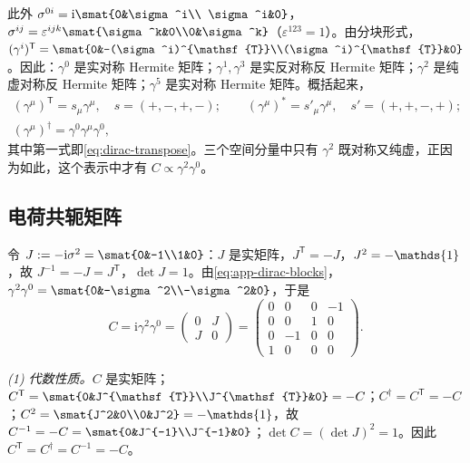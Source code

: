 \documentclass[UTF8,a4paper,11pt,fontset=fandol]{ctexart}
\let\amsmathbb\mathbb
\renewcommand{\mathbb}[1]{\ifx1#1\mathds{1}\else\amsmathbb{#1}\fi}
\theoremstyle{cplain}
\theoremstyle{cdefinition}
\theoremstyle{cremark}
\numberwithin{equation}{section}
\newcommand{\tp}{\mathsf{T}}                         %
\newcommand{\ii}{\mathrm{i}}                        %
\begin{document}
此外 $\sigma^{0i}=\ii\smat{0&\sigma^i\\ \sigma^i&0}$，$\sigma^{ij}=\varepsilon^{ijk}\smat{\sigma^k&0\\0&\sigma^k}$（$\varepsilon^{123}=1$）。由分块形式，$(\gamma^i)^{\tp}=\smat{0&-(\sigma^i)^{\tp}\\(\sigma^i)^{\tp}&0}$。因此：$\gamma^0$ 是实对称 Hermite 矩阵；$\gamma^1,\gamma^3$ 是实反对称反 Hermite 矩阵；$\gamma^2$ 是纯虚对称反 Hermite 矩阵；$\gamma^5$ 是实对称 Hermite 矩阵。概括起来，
\begin{equation}\label{eq:app-dirac-patterns}
\begin{gathered}
(\gamma^\mu)^{\tp}=s_\mu\gamma^\mu,\quad s=(+,-,+,-);\qquad
(\gamma^\mu)^*=s'_\mu\gamma^\mu,\quad s'=(+,+,-,+);\\
(\gamma^\mu)^\dagger=\gamma^0\gamma^\mu\gamma^0 ,
\end{gathered}
\end{equation}
其中第一式即\cref{eq:dirac-transpose}。三个空间分量中只有 $\gamma^2$ 既对称又纯虚，正因为如此，这个表示中才有 $C\propto\gamma^2\gamma^0$。

\subsection{电荷共轭矩阵}\label{app:dirac-C}

令 $J:=-\ii\sigma^2=\smat{0&-1\\1&0}$：$J$ 是实矩阵，$J^{\tp}=-J$，$J^2=-\mathbb 1$，故 $J^{-1}=-J=J^{\tp}$，$\det J=1$。由\cref{eq:app-dirac-blocks}，$\gamma^2\gamma^0=\smat{0&-\sigma^2\\-\sigma^2&0}$，于是
\begin{equation}\label{eq:app-dirac-C}
C=\ii\gamma^2\gamma^0=\begin{pmatrix}0&J\\J&0\end{pmatrix}=\begin{pmatrix}0&0&0&-1\\0&0&1&0\\0&-1&0&0\\1&0&0&0\end{pmatrix}.
\end{equation}

\emph{(1) 代数性质。}$C$ 是实矩阵；$C^{\tp}=\smat{0&J^{\tp}\\J^{\tp}&0}=-C$；$C^\dagger=C^{\tp}=-C$；$C^2=\smat{J^2&0\\0&J^2}=-\mathbb 1$，故 $C^{-1}=-C=\smat{0&J^{-1}\\J^{-1}&0}$；$\det C=(\det J)^2=1$。因此 $C^{\tp}=C^\dagger=C^{-1}=-C$。
\end{document}
